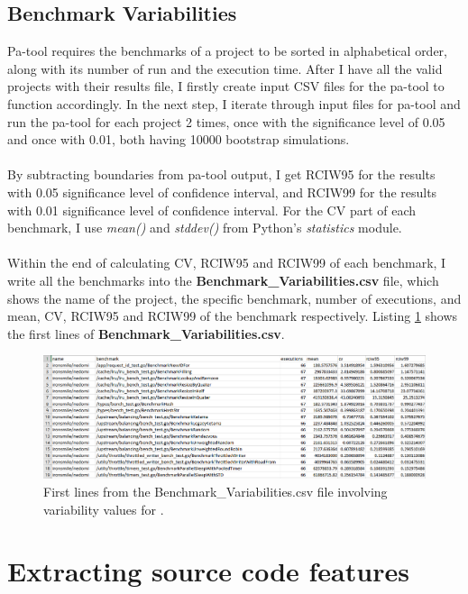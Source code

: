 \documentclass{seal_thesis}
\begin{document}
\subsection{Benchmark Variabilities}
\label{Benchmark Variabilities}

Pa-tool requires the benchmarks of a project to be sorted in alphabetical order, along with its number of run and the execution time. After I have all the valid projects with their results file, I firstly create input CSV files for the pa-tool to function accordingly. In the next step, I iterate through input files for pa-tool and run the pa-tool for each project 2 times, once with the significance level of 0.05 and once with 0.01, both having 10000 bootstrap simulations.\\
\\
By subtracting boundaries from pa-tool output, I get RCIW95 for the results with 0.05 significance level of confidence interval, and RCIW99 for the results with 0.01 significance level of confidence interval. For the CV part of each benchmark, I use \textit{mean()} and \textit{stddev()} from Python's \textit{statistics} module\cite{pythonsta}.\\
\\
Within the end of calculating CV, RCIW95 and RCIW99 of each benchmark, I write all the benchmarks into the \textbf{Benchmark\_Variabilities.csv} file, which shows the name of the project, the specific benchmark, number of executions, and mean, CV, RCIW95 and RCIW99 of the benchmark respectively. Listing \ref{fig:finalcsv} shows the first lines of \textbf{Benchmark\_Variabilities.csv}.

\begin{figure}[H]
	\centering
	\includegraphics[width=\linewidth]{finalcsvexample}
	\caption{First lines from the Benchmark\_Variabilities.csv file involving variability values for \cite{ironsmile/nedomi}.}
	\label{fig:finalcsv}
\end{figure}

\section{Extracting source code features}
\end{document}
